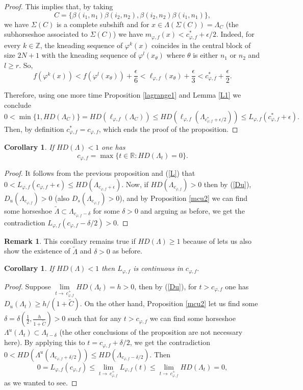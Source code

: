 \documentclass[12pt]{amsart}
\theoremstyle{plain} %
\newtheorem{corollary}[theorem]{Corollary}
\theoremstyle{definition} %
\newtheorem{remark}[theorem]{Remark}
\numberwithin{equation}{section}
\begin{document}
\begin{proof}
This implies that, by taking
$$C=\{\beta(i_1,n_1)\beta(i_2,n_2), \beta(i_2,n_2)\beta(i_1,n_1)\},$$
we have $\Sigma(C)$ is a complete subshift and for  $x\in \Lambda(\Sigma(C))=\Lambda_{C}$ (the subhorseshoe associated to $\Sigma(C)$) we have $m_{\varphi,f}(x)<c^*_{\varphi,f}+\epsilon/2$. Indeed, for every $k\in \mathbb{Z}$, the kneading sequence of $\varphi^k(x)$ coincides in the central block of size $2N+1$ with the kneading sequence of $\varphi^l(x_{\theta})$ where $\theta$ is either $n_1$ or $n_2$ and $l\geq r$. So,
$$f(\varphi^k(x))<f(\varphi^l(x_{\theta}))+\frac{\epsilon}{6}<\ell_{\varphi,f}(x_{\theta})+\frac{\epsilon}{3}< c^*_{\varphi,f}+\frac{\epsilon}{2}.$$

Therefore, using one more time Proposition \ref{lagrange1} and Lemma \ref{L1} we conclude 
$$0<\min \{1,HD(\Lambda_{C})\}=HD(\ell_{\varphi,f}(\Lambda_{C}))\leq HD(\ell_{\varphi,f}(\Lambda_{c^*_{\varphi,f}+\epsilon/2}))\leq L_{\varphi, f}(c^*_{\varphi,f}+\epsilon).$$
Then, by definition $c^*_{\varphi,f}=c_{\varphi,f}$, which ends the proof of the proposition.
\end{proof}
\begin{corollary}If $HD(\Lambda)<1$ one has
 $$c_{\varphi,f}=\max\{t\in \mathbb{R}:HD(\Lambda_t)=0\}.$$
\end{corollary}
\begin{proof}
It follows from the previous proposition and (\ref{L}) that $0<L_{\varphi, f}(c_{\varphi,f}+\epsilon)\leq HD(\Lambda_{c_{\varphi,f}+\epsilon}).$
Now, if $HD(\Lambda_{c_{\varphi,f}})>0$ then by (\ref{Du}), $D_u(\Lambda_{c_{\varphi,f}})>0$ (also $D_s(\Lambda_{c_{\varphi,f}})>0$), and by Proposition \ref{mcu2} we can find some horseshoe $\tilde{\Lambda}\subset\Lambda_{c_{\varphi,f}-\delta}$ for some $\delta>0$ and arguing as before, we get the contradiction $L_{\varphi, f}(c_{\varphi,f}-\delta/2)>0.$   
\end{proof}
\begin{remark}
This corollary remains true if $HD(\Lambda)\geq 1$ because of \cite[Proposition 1]{GCD} lets us also show the existence of $\tilde{\Lambda}$ and $\delta>0$ as before. 
\end{remark}
\begin{corollary}\label{c}
If $HD(\Lambda)<1$ then $L_{\varphi, f}$ is continuous in $c_{\varphi,f}.$
\end{corollary}
\begin{proof}
Suppose $\lim \limits_{t \to\ c_{\varphi,f}^+} HD(\Lambda_t)=h>0$, then by (\ref{Du}), for $t>c_{\varphi,f}$ one has $D_u(\Lambda_t)\geq h/(1+\tilde{C}).$ On the other hand, Proposition \ref{mcu2} let us find some $\delta=\delta(\frac{1}{2},\frac{h}{1+\tilde{C}})>0$ such that for any $t>c_{\varphi,f}$ we can find some horseshoe $\Lambda^u(\Lambda_t)\subset \Lambda_{t-\delta}$ (the other conclusions of the proposition are not necessary here). By applying this to $t=c_{\varphi,f}+\delta/2$, we get the contradiction $0<HD(\Lambda^u(\Lambda_{c_{\varphi,f}+\delta/2}))\leq HD(\Lambda_{c_{\varphi,f}-\delta/2})$. Then 
$$0=L_{\varphi, f}(c_{\varphi,f})\leq \lim \limits_{t \to\ c_{\varphi,f}^+}L_{\varphi, f}(t)\leq\lim \limits_{t \to\ c_{\varphi,f}^+} HD(\Lambda_t)=0,$$ 
as we wanted to see.
\end{proof}
\end{document}

